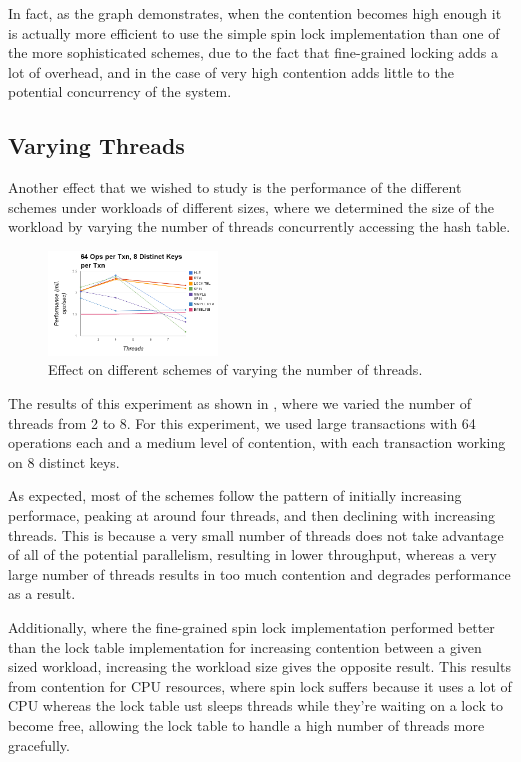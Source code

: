 In fact, as the graph demonstrates, when the contention becomes high enough it 
is actually more efficient to use the simple spin lock implementation than one of 
the more sophisticated schemes, due to the fact that fine-grained locking adds a lot 
of overhead, and in the case of very high contention adds little to the potential 
concurrency of the system.

\subsection{Varying Threads}

Another effect that we wished to study is the performance of the different schemes 
under workloads of different sizes, where we determined the size of the workload 
by varying the number of threads concurrently accessing the hash table.

\begin{figure}[h!]
  \centering
  \includegraphics[width=0.4\textwidth]{figure/threads.png}
  \caption{Effect on different schemes of varying the number of threads.}
  \label{fig:threads} 
\end{figure}

The results of this experiment as shown in , where we varied the number 
of threads from 2 to 8. For this experiment, we used large transactions with 64 
operations each and a medium level of contention, with each transaction working on 
8 distinct keys.

As expected, most of the schemes follow the pattern of initially increasing performace, 
peaking at around four threads, and then declining with increasing threads. This is 
because a very small number of threads does not take advantage of all of the potential 
parallelism, resulting in lower throughput, whereas a very large number of threads 
results in too much contention and degrades performance as a result.

Additionally, where the fine-grained spin lock implementation performed better than 
the lock table implementation for increasing contention between a given sized 
workload, increasing the workload size gives the opposite result. This results from 
contention for CPU resources, where spin lock suffers because it uses a lot of CPU 
whereas the lock table ust sleeps threads while they're waiting on a lock to become 
free, allowing the lock table to handle a high number of threads more gracefully.

